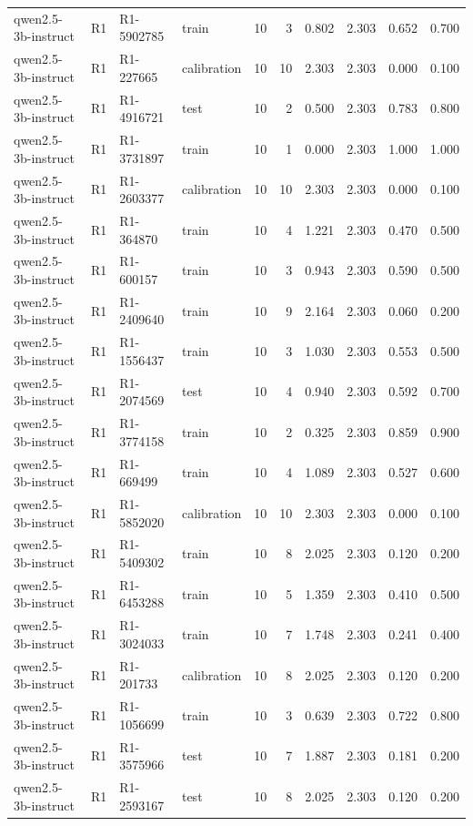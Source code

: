 \begin{table}
\begin{tabular}{llllrrrrrr}
qwen2.5-3b-instruct & R1 & R1-5902785 & train & 10 & 3 & 0.802 & 2.303 & 0.652 & 0.700 \\
qwen2.5-3b-instruct & R1 & R1-227665 & calibration & 10 & 10 & 2.303 & 2.303 & 0.000 & 0.100 \\
qwen2.5-3b-instruct & R1 & R1-4916721 & test & 10 & 2 & 0.500 & 2.303 & 0.783 & 0.800 \\
qwen2.5-3b-instruct & R1 & R1-3731897 & train & 10 & 1 & 0.000 & 2.303 & 1.000 & 1.000 \\
qwen2.5-3b-instruct & R1 & R1-2603377 & calibration & 10 & 10 & 2.303 & 2.303 & 0.000 & 0.100 \\
qwen2.5-3b-instruct & R1 & R1-364870 & train & 10 & 4 & 1.221 & 2.303 & 0.470 & 0.500 \\
qwen2.5-3b-instruct & R1 & R1-600157 & train & 10 & 3 & 0.943 & 2.303 & 0.590 & 0.500 \\
qwen2.5-3b-instruct & R1 & R1-2409640 & train & 10 & 9 & 2.164 & 2.303 & 0.060 & 0.200 \\
qwen2.5-3b-instruct & R1 & R1-1556437 & train & 10 & 3 & 1.030 & 2.303 & 0.553 & 0.500 \\
qwen2.5-3b-instruct & R1 & R1-2074569 & test & 10 & 4 & 0.940 & 2.303 & 0.592 & 0.700 \\
qwen2.5-3b-instruct & R1 & R1-3774158 & train & 10 & 2 & 0.325 & 2.303 & 0.859 & 0.900 \\
qwen2.5-3b-instruct & R1 & R1-669499 & train & 10 & 4 & 1.089 & 2.303 & 0.527 & 0.600 \\
qwen2.5-3b-instruct & R1 & R1-5852020 & calibration & 10 & 10 & 2.303 & 2.303 & 0.000 & 0.100 \\
qwen2.5-3b-instruct & R1 & R1-5409302 & train & 10 & 8 & 2.025 & 2.303 & 0.120 & 0.200 \\
qwen2.5-3b-instruct & R1 & R1-6453288 & train & 10 & 5 & 1.359 & 2.303 & 0.410 & 0.500 \\
qwen2.5-3b-instruct & R1 & R1-3024033 & train & 10 & 7 & 1.748 & 2.303 & 0.241 & 0.400 \\
qwen2.5-3b-instruct & R1 & R1-201733 & calibration & 10 & 8 & 2.025 & 2.303 & 0.120 & 0.200 \\
qwen2.5-3b-instruct & R1 & R1-1056699 & train & 10 & 3 & 0.639 & 2.303 & 0.722 & 0.800 \\
qwen2.5-3b-instruct & R1 & R1-3575966 & test & 10 & 7 & 1.887 & 2.303 & 0.181 & 0.200 \\
qwen2.5-3b-instruct & R1 & R1-2593167 & test & 10 & 8 & 2.025 & 2.303 & 0.120 & 0.200 \\

\end{tabular}
\end{table}
